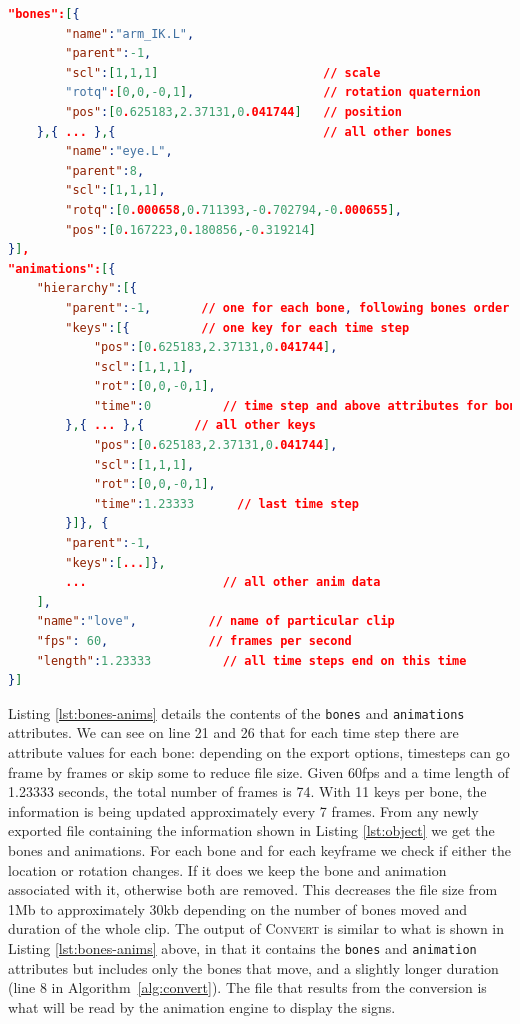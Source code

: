 \documentclass[12pt]{ociamthesis}  %
\begin{document}
\begin{lstlisting}[language=json, caption = \texttt{animation} and \texttt{bones} attributes for the sign \texttt{love}, label = lst:bones-anims]
"bones":[{
		"name":"arm_IK.L",
		"parent":-1,
		"scl":[1,1,1]                       // scale
		"rotq":[0,0,-0,1],                  // rotation quaternion
		"pos":[0.625183,2.37131,0.041744]   // position
	},{ ... },{		                        // all other bones
		"name":"eye.L",
		"parent":8,
		"scl":[1,1,1],
		"rotq":[0.000658,0.711393,-0.702794,-0.000655],
		"pos":[0.167223,0.180856,-0.319214]
}],
"animations":[{
	"hierarchy":[{
		"parent":-1,       // one for each bone, following bones order
		"keys":[{          // one key for each time step
			"pos":[0.625183,2.37131,0.041744],
			"scl":[1,1,1],
			"rot":[0,0,-0,1],
			"time":0	      // time step and above attributes for bone
		},{ ... },{       // all other keys
			"pos":[0.625183,2.37131,0.041744],
			"scl":[1,1,1],
			"rot":[0,0,-0,1],
			"time":1.23333      // last time step
		}]}, {
		"parent":-1,
		"keys":[...]},
		...	                  // all other anim data 
	],
	"name":"love",          // name of particular clip
	"fps": 60,              // frames per second
	"length":1.23333	      // all time steps end on this time
}]
\end{lstlisting}

Listing \ref{lst:bones-anims} details the contents of the \texttt{bones} and \texttt{animations} attributes. We can see on line 21 and 26 that for each time step there are attribute values for each bone: depending on the export options, timesteps can go frame by frames or skip some to reduce file size. Given 60fps and a time length of 1.23333 seconds, the total number of frames is 74. With 11 keys per bone, the information is being updated approximately every 7 frames. From any newly exported file containing the information shown in Listing \ref{lst:object} we get the bones and animations. For each bone and for each keyframe we check if either the location or rotation changes. If it does we keep the bone and animation associated with it, otherwise both are removed. This decreases the file size from 1Mb to approximately 30kb depending on the number of bones moved and duration of the whole clip. The output of \textsc{Convert} is similar to what is shown in Listing \ref{lst:bones-anims} above, in that it contains the \texttt{bones} and \texttt{animation} attributes but includes only the bones that move, and a slightly longer duration (line 8 in Algorithm~\ref{alg:convert}). The file that results from the conversion is what will be read by the animation engine to display the signs.
\end{document}
